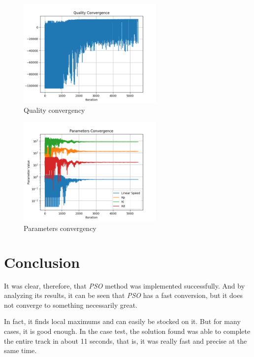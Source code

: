\begin{figure}
  \begin{center}
  \includegraphics[width=2.8in]{./../code/results/line_quality_convergence.png}
  \caption{Quality convergency}
  \label{img:quality_converge}
  \end{center}
\end{figure}

\begin{figure}
  \begin{center}
  \includegraphics[width=2.8in]{./../code/results/line_parameters_convergence.png}
  \caption{Parameters convergency}
  \label{img:parameters_quality_converge}
  \end{center}
\end{figure}

\section {Conclusion}

It was clear, therefore, that \textit{PSO} method was implemented successfully. And by analyzing its results, it can be seen that \textit{PSO} has a fast conversion, but it does not converge to something necessarily great.

In fact, it finds local maximums and can easily be stocked on it. But for many cases, it is good enough. In the case test, the solution found was able to complete the entire track in about 11 seconds, that is, it was really fast and precise at the same time.


